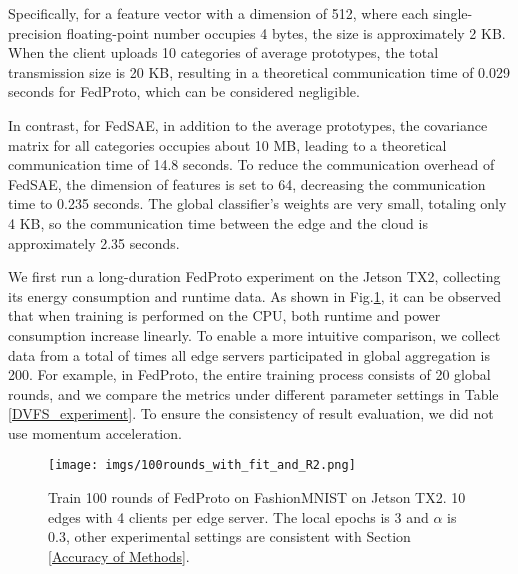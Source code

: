 \documentclass[journal]{IEEEtran}
\begin{document}
Specifically, for a feature vector with a dimension of 512, where each single-precision floating-point number occupies 4 bytes, the size is approximately 2 KB. When the client uploads 10 categories of average prototypes, the total transmission size is 20 KB, resulting in a theoretical communication time of 0.029 seconds for FedProto, which can be considered negligible. 

In contrast, for FedSAE, in addition to the average prototypes, the covariance matrix for all categories occupies about 10 MB, leading to a theoretical communication time of 14.8 seconds. To reduce the communication overhead of FedSAE, the dimension of features is set to 64, decreasing the communication time to 0.235 seconds. The global classifier's weights are very small, totaling only 4 KB, so the communication time between the edge and the cloud is approximately 2.35 seconds.



We first run a long-duration FedProto experiment on the Jetson TX2, collecting its energy consumption and runtime data. As shown in Fig.\ref{100rounds_with_fit_and_R2}, it can be observed that when training is performed on the CPU, both runtime and power consumption increase linearly. To enable a more intuitive comparison, we collect data from a total of times all edge servers participated in global aggregation is 200. For example, in FedProto, the entire training process consists of 20 global rounds, and we compare the metrics under different parameter settings in Table \ref{DVFS_experiment}. To ensure the consistency of result evaluation, we did not use momentum acceleration.

\begin{figure}[htbp]
  \centering
  \texttt{[image: imgs/100rounds\_with\_fit\_and\_R2.png]}
  \caption{Train 100 rounds of FedProto on FashionMNIST on Jetson TX2. 10 edges with 4 clients per edge server. The local epochs is 3 and $\alpha$ is 0.3, other experimental settings are consistent with Section \ref{Accuracy of Methods}.}
  \label{100rounds_with_fit_and_R2}
\end{figure}
\end{document}
